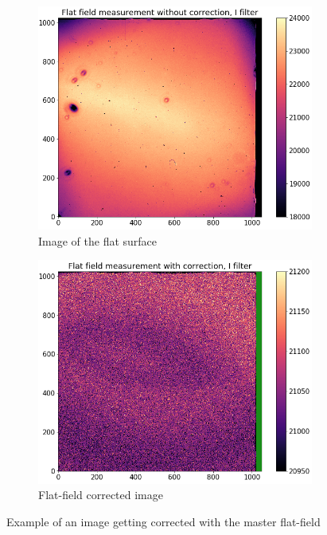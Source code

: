 \begin{figure}[h]
	\begin{subfigure}{0.45\textwidth}
	\centering
	\includegraphics[width=0.95\linewidth]{report_pictures/FlatIFits.png}
	\caption{Image of the flat surface}
	\label{flat_before}
	\end{subfigure}
	\begin{subfigure}{0.45\textwidth}
	\centering
	\includegraphics[width=0.95\linewidth]{report_pictures/FlatIFitsMasterCorrected.png}
	\caption{Flat-field corrected image}
	\label{flat_after}
	\end{subfigure}
	\caption{Example of an image getting corrected with the master flat-field}
	\label{flat_ex}
\end{figure} 
